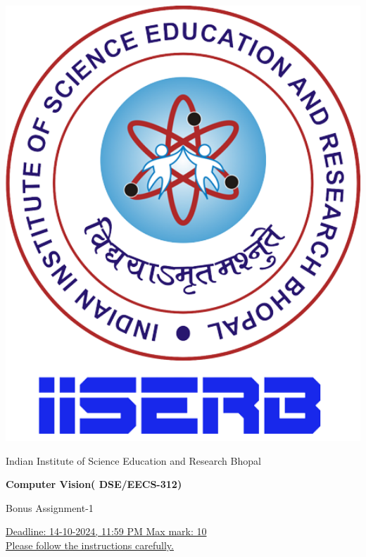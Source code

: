 \documentclass[12pt, a4paper]{exam}
\begin{document}
	\noindent
	\begin{minipage}[l]{0.1\textwidth}
		\noindent
		\includegraphics[width=1.8\textwidth]{res/iiserb_logo.png}
	\end{minipage}
\hfill
\begin{minipage}[c]{0.8\textwidth}
	\begin{center}
		{\large	Indian Institute of Science Education and Research Bhopal \par
		\large	\par
	\large \textbf{	Computer Vision( DSE/EECS-312)}	\par
Bonus Assignment-1}
	\end{center}
\end{minipage}
\par
\vspace{0.2in}
\noindent
\uline{Deadline: 14-10-2024, 11:59 PM	 \hfill 		\hfill Max mark: 10} \\
\uline{Please follow the instructions carefully.}
\par 
\vspace{0.15in}
\end{document}
